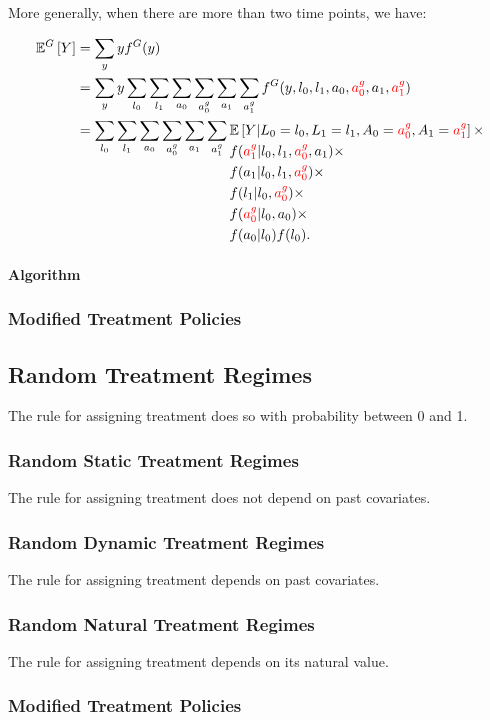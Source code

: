 \documentclass[12pt]{article}
\begin{document}
More generally, when there are more than two time points, we have:

\begin{align}
    \mathbb{E}^G \left[ Y \right] &= \sum_y y f^G(y) \\
    &= \sum_y y \sum_{l_0} \sum_{l_1} \sum_{a_0} \sum_{a_0^g} \sum_{a_1} \sum_{a_1^g} f^G(y,l_0,l_1,a_0,\textcolor{red}{a_0^g},a_1,\textcolor{red}{a_1^g}) \\
    &= \sum_{l_0} \sum_{l_1} \sum_{a_0} \sum_{a_0^g} \sum_{a_1} \sum_{a_1^g}
    \!\begin{aligned}[t]
        &\mathbb{E} \left[ Y|L_0=l_0,L_1=l_1,A_0=\textcolor{red}{a_0^g},A_1=\textcolor{red}{a_1^g}\right]\times\\
        &f(\textcolor{red}{a_1^g}|l_0,l_1,\textcolor{red}{a_0^g},a_1)\times\\
        &f(a_1|l_0,l_1,\textcolor{red}{a_0^g})\times\\
        &f(l_1|l_0,\textcolor{red}{a_0^g})\times\\
        &f(\textcolor{red}{a_0^g}|l_0,a_0)\times\\
        &f(a_0|l_0) f(l_0).
    \end{aligned}
\end{align}

\paragraph{Algorithm}

\subsubsection*{Modified Treatment Policies}

\subsection{Random Treatment Regimes}
The rule for assigning treatment does so with probability between 0 and 1.

\subsubsection*{Random Static Treatment Regimes}
The rule for assigning treatment does not depend on past covariates.

\subsubsection*{Random Dynamic Treatment Regimes}
The rule for assigning treatment depends on past covariates.

\subsubsection*{Random Natural Treatment Regimes}
The rule for assigning treatment depends on its natural value.

\subsubsection*{Modified Treatment Policies}
\end{document}
